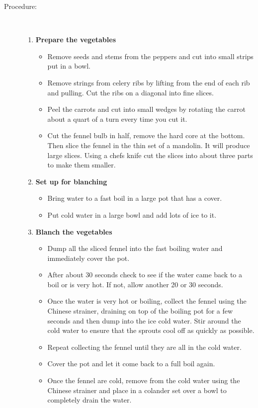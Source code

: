\documentclass[11pt,letterpaper]{article}
\begin{document}
\begin{description}
\item[Procedure:]\ \\
	\begin{enumerate}
	\item {\bf Prepare the vegetables}
	\begin{itemize}
	\item Remove seeds and stems from the peppers and cut into small strips put in a bowl.
	\item Remove strings from celery ribs by lifting from the end of each rib and pulling. Cut the ribs on a diagonal into fine slices.
	\item Peel the carrots and cut into small wedges by rotating the carrot about a quart of a turn every time you cut it.
	\item Cut the fennel bulb in half, remove the hard core at the bottom. Then slice the fennel in the thin set of a mandolin. It will produce large slices. Using a chefs knife cut the slices into about three parts to make them smaller.
	\end{itemize}
	\item {\bf Set up for blanching}
	\begin{itemize}
	\item Bring water to a fast boil in a large pot that has a cover.
	\item Put cold water in a large bowl and add lots of ice to it.
	\end{itemize}
	\item {\bf Blanch the vegetables}
	\begin{itemize}
	\item Dump all the sliced fennel into the fast boiling water and immediately cover the pot.
	\item After about 30 seconds check to see if the water came back to a boil or is very hot. If not, allow another 20 or 30 seconds.
	\item Once the water is very hot or boiling, collect the fennel using the Chinese strainer, draining on top of the boiling pot for a few seconds and then dump into the ice cold water. Stir around the cold water to ensure that the sprouts cool off as quickly as possible.
	\item Repeat collecting the fennel until they are all in the cold water.
	\item Cover the pot and let it come back to a full boil again.
	\item Once the fennel are cold, remove from the cold water using the Chinese strainer and place in a colander set over a bowl to completely drain the water.

\end{itemize}
\end{enumerate}
\end{description}
\end{document}
